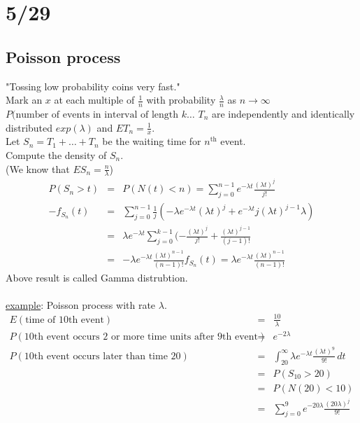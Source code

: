 \section*{5/29}
  \subsection*{Poisson process}
    "Tossing low probability coins very fast."\\
    Mark an $x$ at each multiple of $\frac{1}{n}$ with probability 
    $\frac{\lambda}{n}$ as $n \to \infty$
    $P(\text{number of events in interval of length $k$} \ldots$
    $T_n$ are independently and identically distributed $exp(\lambda)$ and
    $ET_n = \frac{1}{x}$.\\
    Let $S_n = T_1 + \ldots + T_n$ be the waiting time for $n^{\text{th}}$ 
    event.\\
    Compute the density of $S_n$.\\
    (We know that $ES_n = \frac{n}{\lambda}$)\\
    \begin{eqnarray*}
      P(S_n > t) & = & P(N(t) < n) = \sum_{j = 0}^{n-1} e^{-\lambda t} \frac{
      (\lambda t)^j}{j!}\\
     -f_{S_n}(t) & = & \sum_{j = 0}^{n - 1} \frac{1}{j} (-\lambda e^{-\lambda t}
     (\lambda t)^j + e^{-\lambda t} j (\lambda t)^{j - 1} \lambda)\\
     & = & \lambda e^{-\lambda t} \sum_{j = 0}^{k - 1} (-\frac{(\lambda t)^j}
     {j!} + \frac{(\lambda t)^{j - 1}}{(j-1)!}\\
     & = & - \lambda e^{-\lambda t} \frac{(\lambda t)^{n-1}}{(n-1)!}
     f_{S_n}(t) = \lambda e^{-\lambda t}\frac{(\lambda t)^{n-1}}{(n -1)!}
   \end{eqnarray*}
   Above result is called Gamma distrubtion.\\\\
   \underline{example}: Poisson process with rate $\lambda$.\\
   \begin{eqnarray*}
    E(\text{time of 10th event}) & = & \frac{10}{\lambda}\\
    P(\text{10th event occurs 2 or more time units after 9th event}) & = & e^{-2\lambda}\\
    P(\text{10th event occurs later than time 20}) & = & \int_{20}^{\infty} 
    \lambda e^{-\lambda t} \frac{(\lambda t)^9}{9!}\,dt\\
    & = & P(S_{10} > 20)\\
    & = & P(N(20) < 10)\\
    & = & \sum_{j = 0}^9 e^{-20\lambda} \frac{(20\lambda)^j}{9!}\\
   \end{eqnarray*}

